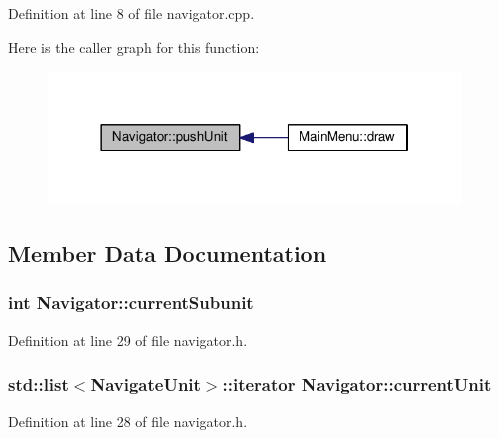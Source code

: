 Definition at line 8 of file navigator.\-cpp.



Here is the caller graph for this function\-:
\nopagebreak
\begin{figure}[H]
\begin{center}
\leavevmode
\includegraphics[width=310pt]{class_navigator_a47967fc9bdfd276c98f8ed1c44d5dc46_icgraph}
\end{center}
\end{figure}




\subsection{Member Data Documentation}
\hypertarget{class_navigator_a616e5c7457f641e3027f68103e0da245}{
\subsubsection[{current\-Subunit}]{\setlength{\rightskip}{0pt plus 5cm}int Navigator\-::current\-Subunit\hspace{0.3cm}{\ttfamily [private]}}}\label{class_navigator_a616e5c7457f641e3027f68103e0da245}


Definition at line 29 of file navigator.\-h.

\hypertarget{class_navigator_a64d901b59121319cb87ca450dcc25912}{
\subsubsection[{current\-Unit}]{\setlength{\rightskip}{0pt plus 5cm}std\-::list$<${\bf Navigate\-Unit}$>$\-::iterator Navigator\-::current\-Unit\hspace{0.3cm}{\ttfamily [private]}}}\label{class_navigator_a64d901b59121319cb87ca450dcc25912}


Definition at line 28 of file navigator.\-h.

